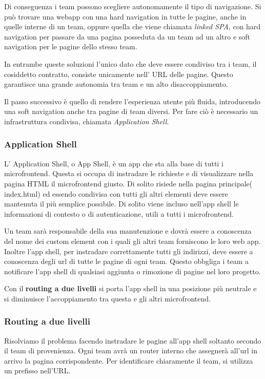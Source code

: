 Di conseguenza i team possono scegliere autonomamente il tipo di navigazione.
Si può trovare una webapp con una hard navigation in tutte le pagine, anche in quelle interne di un team,
oppure quella che viene chiamata \emph{linked SPA}, con hard navigation per passare da una pagina posseduta da un team ad un altro
e soft navigation per le pagine dello stesso team.

In entrambe queste soluzioni l'unico dato che deve essere condiviso tra i team, il cosiddetto contratto, consiste 
unicamente nell' URL delle pagine. Questo garantisce una grande autonomia tra team e un alto disaccoppiamento.

Il passo successivo è quello di rendere l'esperienza utente più fluida, introducendo una soft navigation anche tra pagine di team 
diversi. Per fare ciò è necessario un infrastruttura condivisa, chiamata \emph{Application Shell}.


\subsubsection*{Application Shell}
L' Application Shell, o App Shell, è un app che sta alla base di tutti i microfrontend. Questa si occupa di instradare le
richieste e di visualizzare nella pagina HTML il microfrontend giusto. Di solito risiede nella pagina principale( index.html) ed essendo
condivisa con tutti gli altri elementi deve essere mantenuta il più semplice possibile.
Di solito viene incluso nell'app shell le informazioni di contesto o di autenticazione, utili a tutti i microfrontend.

Un team sarà responsabile della sua manutenzione e dovrà essere a conoscenza del nome dei custom element con i quali gli altri team forniscono
le loro web app.
Inoltre l'app shell, per instradare correttamente tutti gli indirizzi, deve essere a conoscenza degli url di tutte le pagine di ogni team.
Questo obbgliga i team a notificare l'app shell di qualsiasi aggiunta o rimozione di pagine nel loro progetto.

Con il \textbf{routing a due livelli} si porta l'app shell in una posizione più neutrale e si diminuisce l'accoppiamento tra questa e gli altri microfrontend.
\subsubsection*{Routing a due livelli}
Risolviamo il problema facendo instradare le pagine all'app shell soltanto secondo il team di provenienza.
Ogni team avrà un router interno che assegnerà all'url in arrivo la pagina corrispondente.
Per identificare chiaramente il team, si utilizza un prefisso nell'URL.


